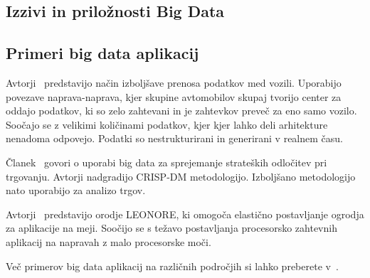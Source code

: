 \subsection{Izzivi in priložnosti Big Data}


\subsection{Primeri big data aplikacij}
Avtorji~\cite{vehicle_networks} predstavijo način izboljšave prenosa podatkov med vozili.
Uporabijo povezave naprava-naprava, kjer skupine avtomobilov skupaj tvorijo center za oddajo podatkov, ki
so zelo zahtevani in je zahtevkov preveč za eno samo vozilo.
Soočajo se z velikimi količinami podatkov, kjer kjer lahko deli arhitekture nenadoma odpovejo.
Podatki so nestrukturirani in generirani v realnem času.

Članek~\cite{a_big_data_analytics_based_methodology} govori o uporabi big data za sprejemanje strateških odločitev
pri trgovanju.
Avtorji nadgradijo CRISP-DM metodologijo.
Izboljšano metodologijo nato uporabijo za analizo trgov.

Avtorji~\cite{scalable_framework_for_provisioning_large_scale_iot_deployments} predstavijo orodje LEONORE,
ki omogoča elastično postavljanje ogrodja za aplikacije na meji.
Soočijo se s težavo postavljanja procesorsko zahtevnih aplikacij na napravah z malo procesorske moči.

Več primerov big data aplikacij na različnih področjih si lahko preberete v~\cite{big_data_analytics_societal_impact}.


